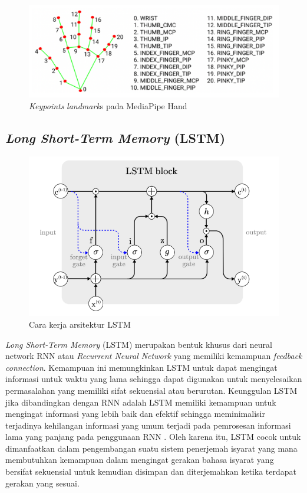 \begin{figure}[H]
    \centering

    \includegraphics[scale=0.5]{gambar/bab2-mp-hand.png}
 
    \caption{\textit{Keypoints} \emph{landmark}s pada MediaPipe Hand}
    \label{fig:mediapipehand}
\end{figure}

\subsection{\textit{Long Short-Term Memory} (LSTM)}

\begin{figure}[H]
    \centering

    \includegraphics[scale=1.2]{gambar/bab2-lstm-model.png}
 
    \caption{Cara kerja arsitektur LSTM}
    \label{fig:longshortterm}
\end{figure}

\textit{Long Short-Term Memory} (LSTM) merupakan bentuk khusus dari neural network RNN atau \textit{Recurrent Neural Network} yang memiliki kemampuan \textit{feedback connection}. Kemampuan ini memungkinkan LSTM untuk dapat mengingat informasi untuk waktu yang lama sehingga dapat digunakan untuk menyelesaikan permasalahan yang memiliki sifat sekuensial atau berurutan. Keunggulan LSTM jika dibandingkan dengan RNN adalah LSTM memiliki kemampuan untuk mengingat informasi yang lebih baik dan efektif sehingga meminimalisir terjadinya kehilangan informasi yang umum terjadi pada pemrosesan informasi lama yang panjang pada penggunaan RNN \parencite{xia2020}. Oleh karena itu, LSTM cocok untuk dimanfaatkan dalam pengembangan suatu sistem penerjemah isyarat yang mana membutuhkan kemampuan dalam mengingat gerakan bahasa isyarat yang bersifat sekuensial untuk kemudian disimpan dan diterjemahkan ketika terdapat gerakan yang sesuai.

